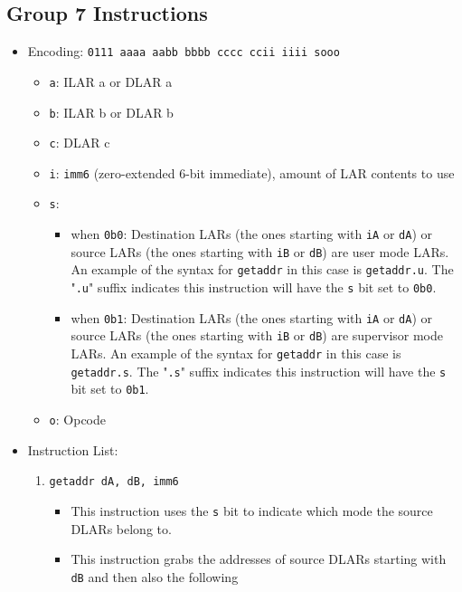 \documentclass{article}
\begin{document}
	\subsection{Group 7 Instructions}
		\begin{itemize}
		\item Encoding: \texttt{0111 aaaa aabb bbbb  cccc ccii iiii sooo}
			\begin{itemize}
			\item \texttt{a}: ILAR a or DLAR a
			\item \texttt{b}: ILAR b or DLAR b
			\item \texttt{c}: DLAR c
			\item \texttt{i}: \texttt{imm6} (zero-extended 6-bit
				immediate), amount of LAR contents to use
			\item \texttt{s}:
				\begin{itemize}
				\item when \texttt{0b0}: Destination LARs (the ones
					starting with \texttt{iA} or \texttt{dA}) or source
					LARs (the ones starting with \texttt{iB} or
					\texttt{dB}) are user mode LARs. An example of the
					syntax for \texttt{getaddr} in this case is
					\texttt{getaddr.u}. The "\texttt{.u}" suffix indicates
					this instruction will have the \texttt{s} bit set to
					\texttt{0b0}.
				\item when \texttt{0b1}: Destination LARs (the ones
					starting with \texttt{iA} or \texttt{dA}) or source
					LARs (the ones starting with \texttt{iB} or
					\texttt{dB}) are supervisor mode LARs. An example of
					the syntax for \texttt{getaddr} in this case is
					\texttt{getaddr.s}. The "\texttt{.s}" suffix indicates
					this instruction will have the \texttt{s} bit set to
					\texttt{0b1}.
				\end{itemize}
			\item \texttt{o}: Opcode
			\end{itemize}
		\item Instruction List:
			\begin{enumerate}
			\item \texttt{getaddr dA, dB, imm6}
				\begin{itemize}
				\item This instruction uses the \texttt{s} bit to indicate
					which mode the source DLARs belong to.
				\item This instruction grabs the addresses of source DLARs
					starting with \texttt{dB} and then also the following

\end{itemize}
\end{enumerate}
\end{itemize}
\end{document}
